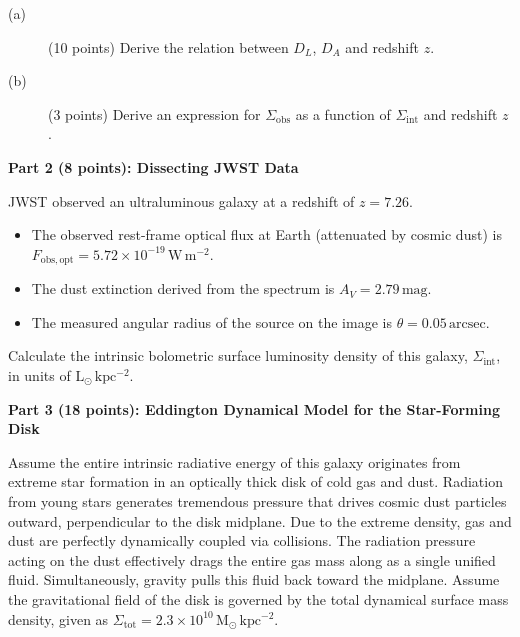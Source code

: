 \begin{description}
\item[(a)] (10 points) Derive the relation between $D_L$, $D_A$ and redshift
  $z$.
\item[(b)] (3 points) Derive an expression for $\Sigma_{\mathrm{obs}}$ as a
  function of $\Sigma_{\mathrm{int}}$ and redshift $z$.
\end{description}

\medskip\noindent\textbf{Part 2 (8 points): Dissecting JWST Data}

JWST observed an ultraluminous galaxy at a redshift of $z = 7.26$.
\begin{itemize}
\item The observed rest-frame optical flux at Earth (attenuated by cosmic
  dust) is $F_{\mathrm{obs,opt}} = 5.72 \times 10^{-19}\,\mathrm{W\,m^{-2}}$.
\item The dust extinction derived from the spectrum is
  $A_V = 2.79\,\mathrm{mag}$.
\item The measured angular radius of the source on the image is
  $\theta = 0.05\,\mathrm{arcsec}$.
\end{itemize}
Calculate the intrinsic bolometric surface luminosity density of this galaxy,
$\Sigma_{\mathrm{int}}$, in units of $\mathrm{L_\odot\,kpc^{-2}}$.

\medskip\noindent\textbf{Part 3 (18 points): Eddington Dynamical Model for the Star-Forming Disk}

Assume the entire intrinsic radiative energy of this galaxy originates from
extreme star formation in an optically thick disk of cold gas and dust.
Radiation from young stars generates tremendous pressure that drives cosmic
dust particles outward, perpendicular to the disk midplane. Due to the extreme
density, gas and dust are perfectly dynamically coupled via collisions. The
radiation pressure acting on the dust effectively drags the entire gas mass
along as a single unified fluid. Simultaneously, gravity pulls this fluid back
toward the midplane. Assume the gravitational field of the disk is governed by
the total dynamical surface mass density, given as
$\Sigma_{\mathrm{tot}} = 2.3 \times 10^{10}\,\mathrm{M_\odot\,kpc^{-2}}$.


